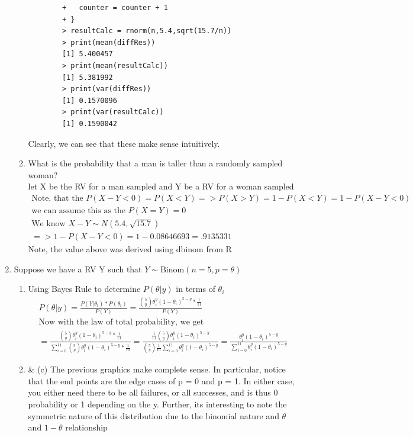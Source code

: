 \documentclass[11pt]{article}
\begin{document}
\begin{enumerate}
\begin{enumerate}
\begin{verbatim}
		+   counter = counter + 1
		+ }
		> resultCalc = rnorm(n,5.4,sqrt(15.7/n))
		> print(mean(diffRes))
		[1] 5.400457
		> print(mean(resultCalc))
		[1] 5.381992
		> print(var(diffRes))
		[1] 0.1570096
		> print(var(resultCalc))
		[1] 0.1590042
	\end{verbatim}
	Clearly, we can see that these make sense intuitively.\\
	\item What is the probability that a man is taller than a randomly sampled woman?\\
	let X be the RV for a man sampled and Y be a RV for a woman sampled
	\begin{gather}
		\text{Note, that the } P(X-Y<0) = P(X<Y) => P(X>Y) = 1 - P(X<Y) = 1 -P(X-Y<0) \\
		\text{we can assume this as the } P(X=Y) = 0\\
		\text{We know } X-Y \sim N(5.4,\sqrt{15.7})\\
		=> 1-P(X-Y<0) = 1 - 0.08646693 = .9135331
	\end{gather}
	Note, the value above was derived using dbinom from R
\end{enumerate}
\item Suppose we have a RV Y such that $Y \sim \text{Binom}(n=5,p = \theta)$
\begin{enumerate}
	\item Using Bayes Rule to determine $P(\theta | y)$ in terms of $\theta_i$
	\begin{gather}
		 P(\theta | y) = \frac{P(Y | \theta_i) * P(\theta_i)}{P(Y)} = \frac{\binom{5}{y} \theta_i^y(1-\theta_i)^{5-y} * \frac{1}{11}}{P(Y)}
		 \\
		 \text{Now with the law of total probability, we get}\\
		 = \frac{\binom{5}{y} \theta_i^y(1-\theta_i)^{5-y} * \frac{1}{11}}{\sum_{i=0}^{11}\binom{5}{y} \theta_i^y(1-\theta_i)^{5-y} * \frac{1}{11}} = \frac{\frac{1}{11}\binom{5}{y} \theta_i^y(1-\theta_i)^{5-y}}{\binom{5}{y} \frac{1}{11}\sum_{i=0}^{11} \theta_i^y(1-\theta_i)^{5-y}} = \frac{ \theta_i^y(1-\theta_i)^{5-y}}{\sum_{i=0}^{11} \theta_i^y(1-\theta_i)^{5-y}}
	\end{gather}
	\item \& (c)
	The previous graphics make complete sense. In particular, notice that the end points are the edge cases of p = 0 and p = 1. In either case, you either need there to be all failures, or all successes, and is thus 0 probability or 1 depending on the y.
	Further, its interesting to note the symmetric nature of this distribution due to the binomial nature and  $\theta$ and $1-\theta$ relationship

\end{enumerate}
\end{enumerate}
\end{document}
